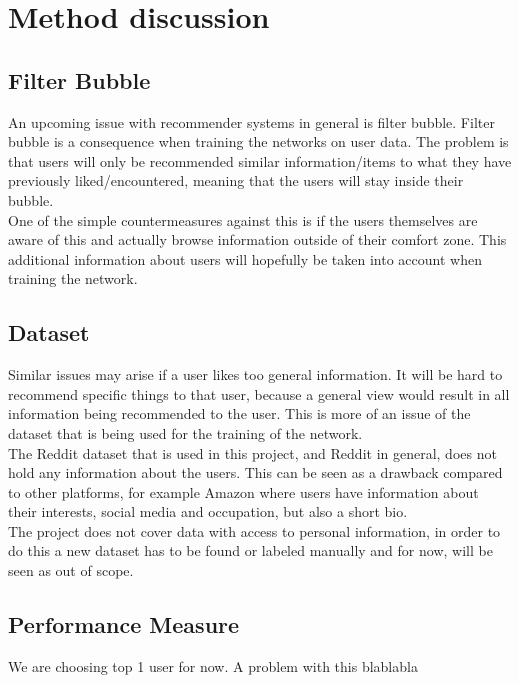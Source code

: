 \chapter{Method discussion}%
\section{Filter Bubble}
An upcoming issue with recommender systems in general is filter bubble.
Filter bubble is a consequence when training the networks on user data. The problem is that users will only be recommended similar information/items to what they have previously liked/encountered, meaning that the users will stay inside their bubble. \\
One of the simple countermeasures against this is if the users themselves are aware of this and actually browse information outside of their comfort zone. This additional information about users will hopefully be taken into account when training the network. \\

\section{Dataset}
Similar issues may arise if a user likes too general information. It will be hard to recommend specific things to that user, because a general view would result in all information being recommended to the user. This is more of an issue of the dataset that is being used for the training of the network. 
\\
The Reddit dataset that is used in this project, and Reddit in general, does not hold any information about the users. This can be seen as a drawback compared to other platforms, for example Amazon where users have information about their interests, social media and occupation, but also a short bio. \\
The project does not cover data with access to personal information, in order to do this a new dataset has to be found or labeled manually and for now, will be seen as out of scope.


\section{Performance Measure}%
We are choosing top 1 user for now. A problem with this blablabla 


